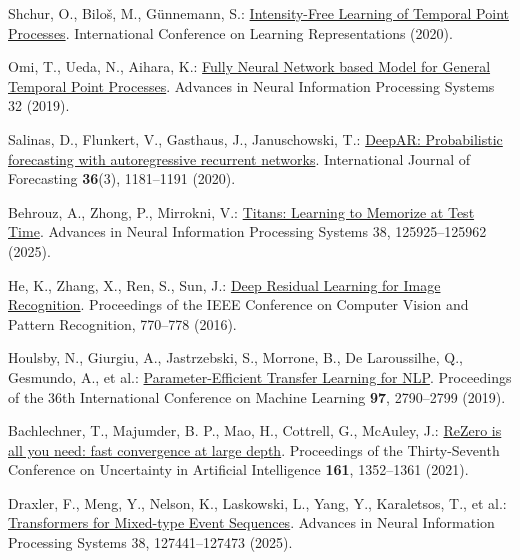 Shchur, O., Bilo\v{s}, M., G\"{u}nnemann, S.: \href{https://openreview.net/forum?id=HygOjhEYDH}{Intensity-Free Learning of Temporal Point Processes}. International Conference on Learning Representations (2020).

Omi, T., Ueda, N., Aihara, K.: \href{https://proceedings.neurips.cc/paper/2019/hash/39e4973ba3321b80f37d9b55f63ed8b8-Abstract.html}{Fully Neural Network based Model for General Temporal Point Processes}. Advances in Neural Information Processing Systems 32 (2019).

Salinas, D., Flunkert, V., Gasthaus, J., Januschowski, T.: \href{https://www.sciencedirect.com/science/article/pii/S0169207019301888}{DeepAR: Probabilistic forecasting with autoregressive recurrent networks}. International Journal of Forecasting \textbf{36}(3), 1181--1191 (2020). 

Behrouz, A., Zhong, P., Mirrokni, V.: \href{https://papers.nips.cc/paper_files/paper/2025/hash/a4ca07aa108036f80cbb5b82285fd4b1-Abstract-Conference.html}{Titans: Learning to Memorize at Test Time}. Advances in Neural Information Processing Systems 38, 125925--125962 (2025). 

He, K., Zhang, X., Ren, S., Sun, J.: \href{https://openaccess.thecvf.com/content_cvpr_2016/html/He_Deep_Residual_Learning_CVPR_2016_paper.html}{Deep Residual Learning for Image Recognition}. Proceedings of the IEEE Conference on Computer Vision and Pattern Recognition, 770--778 (2016). 

Houlsby, N., Giurgiu, A., Jastrzebski, S., Morrone, B., De Laroussilhe, Q., Gesmundo, A., et al.: \href{https://proceedings.mlr.press/v97/houlsby19a.html}{Parameter-Efficient Transfer Learning for NLP}. Proceedings of the 36th International Conference on Machine Learning \textbf{97}, 2790--2799 (2019).

Bachlechner, T., Majumder, B. P., Mao, H., Cottrell, G., McAuley, J.: \href{https://proceedings.mlr.press/v161/bachlechner21a.html}{ReZero is all you need: fast convergence at large depth}. Proceedings of the Thirty-Seventh Conference on Uncertainty in Artificial Intelligence \textbf{161}, 1352--1361 (2021).

Draxler, F., Meng, Y., Nelson, K., Laskowski, L., Yang, Y., Karaletsos, T., et al.: \href{https://proceedings.nips.cc/paper_files/paper/2025/hash/a6c7515ac435277dc92b75a07bb2257c-Abstract-Conference.html}{Transformers for Mixed-type Event Sequences}. Advances in Neural Information Processing Systems 38, 127441--127473 (2025). 


